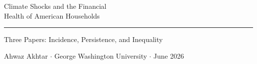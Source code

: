 \documentclass[aspectratio=169,11pt]{beamer}
\begin{document}
\begingroup
{}
\begin{frame}[plain]
  \vspace{0.65cm}
  \hspace{0.6cm}%
  {\color{white}\bfseries\fontsize{22}{28}\selectfont
    \parbox{13cm}{Climate Shocks and the Financial\\Health of American Households}}
  \par\vspace{0.45em}
  \hspace{0.6cm}%
  {\color{WarmOrange}\rule{12cm}{2pt}}
  \par\vspace{0.45em}
  \hspace{0.6cm}%
  {\color{Teal}\normalsize Three Papers: Incidence, Persistence, and Inequality}
  \par\vspace{0.35em}
  \hspace{0.6cm}%
  {\color{WarmGray}\small Ahwaz Akhtar \(\cdot\) George Washington University \(\cdot\) June 2026}
\end{frame}
\endgroup
\end{document}
